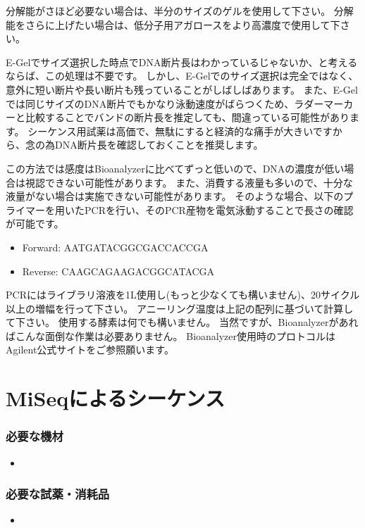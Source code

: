 \documentclass[titlepage,10pt,a4paper,uplatex]{jsbook}
\begin{document}
分解能がさほど必要ない場合は、半分のサイズのゲルを使用して下さい。
分解能をさらに上げたい場合は、低分子用アガロースをより高濃度で使用して下さい。

E-Gelでサイズ選択した時点でDNA断片長はわかっているじゃないか、と考えるならば、この処理は不要です。
しかし、E-Gelでのサイズ選択は完全ではなく、意外に短い断片や長い断片も残っていることがしばしばあります。
また、E-Gelでは同じサイズのDNA断片でもかなり泳動速度がばらつくため、ラダーマーカーと比較することでバンドの断片長を推定しても、間違っている可能性があります。
シーケンス用試薬は高価で、無駄にすると経済的な痛手が大きいですから、念の為DNA断片長を確認しておくことを推奨します。

この方法では感度はBioanalyzerに比べてずっと低いので、DNAの濃度が低い場合は視認できない可能性があります。
また、消費する液量も多いので、十分な液量がない場合は実施できない可能性があります。
そのような場合、以下のプライマーを用いたPCRを行い、そのPCR産物を電気泳動することで長さの確認が可能です。

\begin{itemize}
\item Forward: AATGATACGGCGACCACCGA
\item Reverse: CAAGCAGAAGACGGCATACGA
\end{itemize}

PCRにはライブラリ溶液を1{\textmu}L使用し(もっと少なくても構いません)、20サイクル以上の増幅を行って下さい。
アニーリング温度は上記の配列に基づいて計算して下さい。
使用する酵素は何でも構いません。
当然ですが、Bioanalyzerがあればこんな面倒な作業は必要ありません。
Bioanalyzer使用時のプロトコルはAgilent公式サイトをご参照願います。

\section{MiSeqによるシーケンス}

\subsubsection{必要な機材}
\begin{itemize}
\item 
\end{itemize}

\subsubsection{必要な試薬・消耗品}
\begin{itemize}
\item 
\end{itemize}
\end{document}
